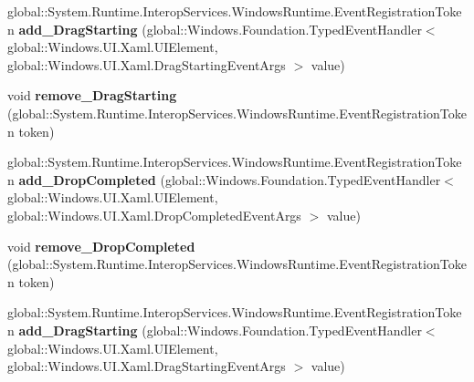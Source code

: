 \begin{DoxyCompactItemize}
\item 
\mbox{\label{interface_windows_1_1_u_i_1_1_xaml_1_1_i_u_i_element3_a65b4b6369aa0a951c30016151b14ac95}} 
global\+::\+System.\+Runtime.\+Interop\+Services.\+Windows\+Runtime.\+Event\+Registration\+Token {\bfseries add\+\_\+\+Drag\+Starting} (global\+::\+Windows.\+Foundation.\+Typed\+Event\+Handler$<$ global\+::\+Windows.\+U\+I.\+Xaml.\+U\+I\+Element, global\+::\+Windows.\+U\+I.\+Xaml.\+Drag\+Starting\+Event\+Args $>$ value)
\item 
\mbox{\label{interface_windows_1_1_u_i_1_1_xaml_1_1_i_u_i_element3_a9763c1f3007106faa5edbab72152e864}} 
void {\bfseries remove\+\_\+\+Drag\+Starting} (global\+::\+System.\+Runtime.\+Interop\+Services.\+Windows\+Runtime.\+Event\+Registration\+Token token)
\item 
\mbox{\label{interface_windows_1_1_u_i_1_1_xaml_1_1_i_u_i_element3_aa1dd03e3acd153862a9ab2a172d49cd0}} 
global\+::\+System.\+Runtime.\+Interop\+Services.\+Windows\+Runtime.\+Event\+Registration\+Token {\bfseries add\+\_\+\+Drop\+Completed} (global\+::\+Windows.\+Foundation.\+Typed\+Event\+Handler$<$ global\+::\+Windows.\+U\+I.\+Xaml.\+U\+I\+Element, global\+::\+Windows.\+U\+I.\+Xaml.\+Drop\+Completed\+Event\+Args $>$ value)
\item 
\mbox{\label{interface_windows_1_1_u_i_1_1_xaml_1_1_i_u_i_element3_ab5b2415864634b87ef93d36e64e197a5}} 
void {\bfseries remove\+\_\+\+Drop\+Completed} (global\+::\+System.\+Runtime.\+Interop\+Services.\+Windows\+Runtime.\+Event\+Registration\+Token token)
\item 
\mbox{\label{interface_windows_1_1_u_i_1_1_xaml_1_1_i_u_i_element3_a65b4b6369aa0a951c30016151b14ac95}} 
global\+::\+System.\+Runtime.\+Interop\+Services.\+Windows\+Runtime.\+Event\+Registration\+Token {\bfseries add\+\_\+\+Drag\+Starting} (global\+::\+Windows.\+Foundation.\+Typed\+Event\+Handler$<$ global\+::\+Windows.\+U\+I.\+Xaml.\+U\+I\+Element, global\+::\+Windows.\+U\+I.\+Xaml.\+Drag\+Starting\+Event\+Args $>$ value)
\item 
\mbox{\label{interface_windows_1_1_u_i_1_1_xaml_1_1_i_u_i_element3_a9763c1f3007106faa5edbab72152e864}} 

\end{DoxyCompactItemize}

